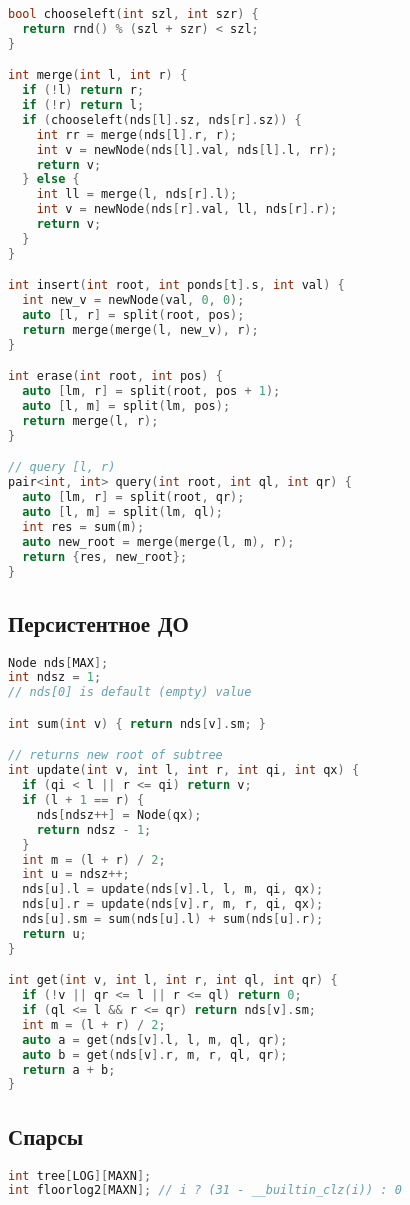 \documentclass[9pt,a4paper,landscape,twosided]{extarticle}
\begin{document}
\begin{multicols*}{3}
\begin{lstlisting}[language=C++]
bool chooseleft(int szl, int szr) {
  return rnd() % (szl + szr) < szl;
}

int merge(int l, int r) {
  if (!l) return r;
  if (!r) return l;
  if (chooseleft(nds[l].sz, nds[r].sz)) {
    int rr = merge(nds[l].r, r);
    int v = newNode(nds[l].val, nds[l].l, rr);
    return v;
  } else {
    int ll = merge(l, nds[r].l);
    int v = newNode(nds[r].val, ll, nds[r].r);
    return v;
  }
}

int insert(int root, int ponds[t].s, int val) {
  int new_v = newNode(val, 0, 0);
  auto [l, r] = split(root, pos);
  return merge(merge(l, new_v), r);
}

int erase(int root, int pos) {
  auto [lm, r] = split(root, pos + 1);
  auto [l, m] = split(lm, pos);
  return merge(l, r);
}

// query [l, r)
pair<int, int> query(int root, int ql, int qr) {
  auto [lm, r] = split(root, qr);
  auto [l, m] = split(lm, ql);
  int res = sum(m);
  auto new_root = merge(merge(l, m), r);
  return {res, new_root};
}

\end{lstlisting}

\subsection{Персистентное ДО}
\begin{lstlisting}[language=C++]
Node nds[MAX];
int ndsz = 1;
// nds[0] is default (empty) value

int sum(int v) { return nds[v].sm; }

// returns new root of subtree
int update(int v, int l, int r, int qi, int qx) {
  if (qi < l || r <= qi) return v;
  if (l + 1 == r) {
    nds[ndsz++] = Node(qx);
    return ndsz - 1;
  }
  int m = (l + r) / 2;
  int u = ndsz++;
  nds[u].l = update(nds[v].l, l, m, qi, qx);
  nds[u].r = update(nds[v].r, m, r, qi, qx);
  nds[u].sm = sum(nds[u].l) + sum(nds[u].r);
  return u;
}

int get(int v, int l, int r, int ql, int qr) {
  if (!v || qr <= l || r <= ql) return 0;
  if (ql <= l && r <= qr) return nds[v].sm;
  int m = (l + r) / 2;
  auto a = get(nds[v].l, l, m, ql, qr);
  auto b = get(nds[v].r, m, r, ql, qr);
  return a + b;
}

\end{lstlisting}

\subsection{Спарсы}
\begin{lstlisting}[language=C++]
int tree[LOG][MAXN];
int floorlog2[MAXN]; // i ? (31 - __builtin_clz(i)) : 0


\end{lstlisting}
\end{multicols*}
\end{document}
